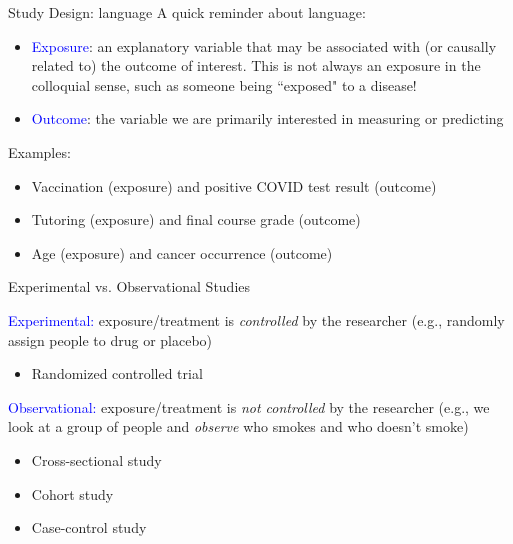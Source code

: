 \documentclass[10pt,t]{beamer}
\begin{document}
\begin{frame}{Study Design: language}
	A quick reminder about language:
	
	\vspace{0.3cm}
	
	\begin{itemize}
		\item \textcolor{blue}{Exposure}: an explanatory variable that may be associated with (or causally related to) the outcome of interest. This is not always an exposure in the colloquial sense, such as someone being ``exposed" to a disease!
		\item \textcolor{blue}{Outcome}: the variable we are primarily interested in measuring or predicting
	\end{itemize}
\vspace{0.3cm}
Examples: 
\vspace{0.3cm}
\begin{itemize}
	\item Vaccination (exposure) and positive COVID test result (outcome)
	\item Tutoring (exposure) and final course grade (outcome)
	\item Age (exposure) and cancer occurrence (outcome)
\end{itemize}
\end{frame}

\begin{frame}{Experimental vs. Observational Studies}

\textcolor{blue}{Experimental:} exposure/treatment is \textit{controlled} by the researcher (e.g., randomly assign people to drug or placebo)
\begin{itemize}
	\item Randomized controlled trial 
\end{itemize}

\vspace{0.3cm}

\textcolor{blue}{Observational:} exposure/treatment is \textit{not controlled} by the researcher (e.g., we look at a group of people and \textit{observe} who smokes and who doesn't smoke)
\begin{itemize}
	\item Cross-sectional study
	\item Cohort study
	\item Case-control study
\end{itemize}
\end{frame}
	
\end{document}
